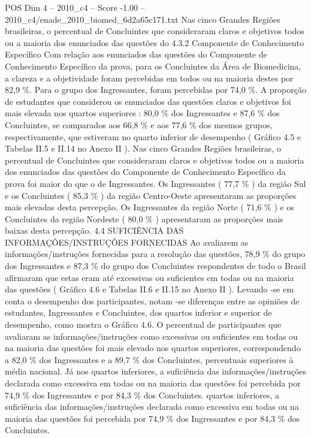 \begin{textsample}{POS Dim 4 – 2010\_c4 – Score -1.00 – 2010\_c4/enade\_2010\_biomed\_6d2a65c171.txt}
Nas cinco Grandes Regiões brasileiras, o percentual de Concluintes que consideraram claros e objetivos todos ou a maioria dos enunciados das questões do 4.3.2 Componente de Conhecimento Específico Com relação aos enunciados das questões do Componente de Conhecimento Específico da prova, para os Concluintes da Área de Biomedicina, a clareza e a objetividade foram percebidas em todos ou na maioria destes por 82,9 \%.
Para o grupo dos Ingressantes, foram percebidas por 74,0 \%.
A proporção de estudantes que considerou os enunciados das questões claros e objetivos foi mais elevada nos quartos superiores : 80,0 \% dos Ingressantes e 87,6 \% dos Concluintes, se comparados aos 66,8 \% e aos 77,6 \% dos mesmos grupos, respectivamente, que estiveram no quarto inferior de desempenho ( Gráfico 4.5 e Tabelas II.5 e II.14 no Anexo II ).
Nas cinco Grandes Regiões brasileiras, o percentual de Concluintes que consideraram claros e objetivos todos ou a maioria dos enunciados das questões do Componente de Conhecimento Específico da prova foi maior do que o de Ingressantes.
Os Ingressantes ( 77,7 \% ) da região Sul e os Concluintes ( 85,3 \% ) da região Centro-Oeste apresentaram as proporções mais elevadas desta percepção.
Os Ingressantes da região Norte ( 71,6 \% ) e os Concluintes da região Nordeste ( 80,0 \% ) apresentaram as proporções mais baixas desta percepção. 4.4 SUFICIÊNCIA DAS INFORMAÇÕES/INSTRUÇÕES FORNECIDAS Ao avaliarem as informações/instruções fornecidas para a resolução das questões, 78,9 \% do grupo dos Ingressantes e 87,3 \% do grupo dos Concluintes respondentes de todo o Brasil afirmaram que estas eram até excessivas ou suficientes em todas ou na maioria das questões ( Gráfico 4.6 e Tabelas II.6 e II.15 no Anexo II ).
Levando -se em conta o desempenho dos participantes, notam -se diferenças entre as opiniões de estudantes, Ingressantes e Concluintes, dos quartos inferior e superior de desempenho, como mostra o Gráfico 4.6.
O percentual de participantes que avaliaram as informações/instruções como excessivas ou suficientes em todas ou na maioria das questões foi mais elevado nos quartos superiores, correspondendo a 82,0 \% dos Ingressantes e a 89,7 \% dos Concluintes, percentuais superiores à média nacional.
Já nos quartos inferiores, a suficiência das informações/instruções declarada como excessiva em todas ou na maioria das questões foi percebida por 74,9 \% dos Ingressantes e por 84,3 \% dos Concluintes. quartos inferiores, a suficiência das informações/instruções declarada como excessiva em todas ou na maioria das questões foi percebida por 74,9 \% dos Ingressantes e por 84,3 \% dos Concluintes.

\end{textsample}
